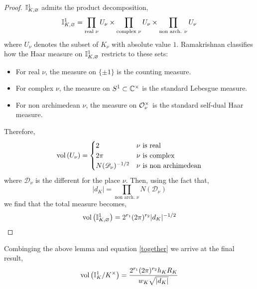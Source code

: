 \documentclass[12pt]{extarticle}
\begin{document}
\begin{enumerate}
\begin{proof}
$\mathbb{I}^1_{K, \varnothing}$ admits the product decomposition,
\[ \mathbb{I}^1_{K, \varnothing} = \prod_{\text{real } \nu} U_\nu \times \prod_{\text{complex } \nu} U_\nu \times \prod_{\text{non arch. } \nu} U_\nu \]
where $U_\nu$ denotes the subset of $K_\nu$ with absolute value $1$. Ramakrishnan classifies how the Haar measure on $\mathbb{I}^1_{K, \varnothing}$ restricts to these sets:
\begin{itemize}
\item For real $\nu$, the measure on $\{\pm 1\}$ is the counting measure.
\item For complex $\nu$, the measure on $S^1 \subset \mathbb{C}^\times$ is the standard Lebesgue measure.
\item For non archimedean $\nu$, the measure on $\mathcal{O}_{\nu}^\times$ is the standard self-dual Haar measure. 
\end{itemize}
Therefore,
\begin{equation}
\mathrm{vol}\left( U_\nu \right) = \begin{cases}
2 & \nu \text{ is real} \\
2 \pi & \nu \text{ is complex} \\
N(\mathscr{D}_\nu)^{-1/2} & \nu \text{ is non archimedean}
\end{cases}
\end{equation}
where $\mathscr{D}_\nu$ is the different for the place $\nu$.
Then, using the fact that,
\begin{equation}
|d_K| = \prod_{\text{non arch. } \nu} N(\mathscr{D}_\nu)
\end{equation}
we find that the total measure becomes,
\begin{equation}
\mathrm{vol}\left( \mathbb{I}^1_{K, \varnothing} \right) = 2^{r_1} (2 \pi)^{r_2} |d_K|^{-1/2}
\end{equation}
\end{proof}

Combinging the above lemma and equation \ref{together} we arrive at the final result,
\begin{equation}
\mathrm{vol}\left( \mathbb{I}^1_{K} / K^\times \right) = \frac{2^{r_1} (2 \pi)^{r_2} h_K R_K}{w_K \sqrt{|d_K|}} 
\end{equation}


\end{enumerate}
\end{document}
